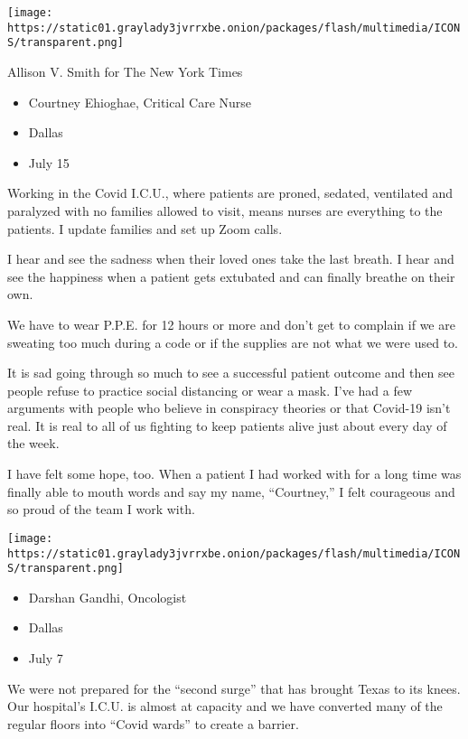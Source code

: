 \texttt{[image: https://static01.graylady3jvrrxbe.onion/packages/flash/multimedia/ICONS/transparent.png]}

Allison V. Smith for The New York Times

\begin{itemize}
\tightlist
\item
  Courtney Ehioghae, Critical Care Nurse
\item
  Dallas
\item
  July 15
\end{itemize}

Working in the Covid I.C.U., where patients are proned, sedated,
ventilated and paralyzed with no families allowed to visit, means nurses
are everything to the patients. I update families and set up Zoom calls.

I hear and see the sadness when their loved ones take the last breath. I
hear and see the happiness when a patient gets extubated and can finally
breathe on their own.

We have to wear P.P.E. for 12 hours or more and don't get to complain if
we are sweating too much during a code or if the supplies are not what
we were used to.

It is sad going through so much to see a successful patient outcome and
then see people refuse to practice social distancing or wear a mask.
I've had a few arguments with people who believe in conspiracy theories
or that Covid-19 isn't real. It is real to all of us fighting to keep
patients alive just about every day of the week.

I have felt some hope, too. When a patient I had worked with for a long
time was finally able to mouth words and say my name, ``Courtney,'' I
felt courageous and so proud of the team I work with.

\texttt{[image: https://static01.graylady3jvrrxbe.onion/packages/flash/multimedia/ICONS/transparent.png]}

\begin{itemize}
\tightlist
\item
  Darshan Gandhi, Oncologist
\item
  Dallas
\item
  July 7
\end{itemize}

We were not prepared for the ``second surge'' that has brought Texas to
its knees. Our hospital's I.C.U. is almost at capacity and we have
converted many of the regular floors into ``Covid wards'' to create a
barrier.

